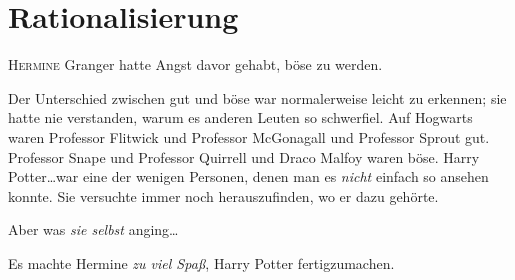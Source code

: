\chapter{Rationalisierung}


\lettrine{H}{ermine} Granger hatte Angst davor gehabt, böse zu werden.

\hplettrineextrapara
Der Unterschied zwischen gut und böse war normalerweise leicht zu erkennen; sie hatte nie verstanden, warum es anderen Leuten so schwerfiel. Auf Hogwarts waren Professor Flitwick und Professor McGonagall und Professor Sprout gut. Professor Snape und Professor Quirrell und Draco Malfoy waren böse. Harry Potter…war eine der wenigen Personen, denen man es \emph{nicht} einfach so ansehen konnte. Sie versuchte immer noch herauszufinden, wo er dazu gehörte.

Aber was \emph{sie selbst} anging…

Es machte Hermine \emph{zu viel Spaß}, Harry Potter fertigzumachen.

